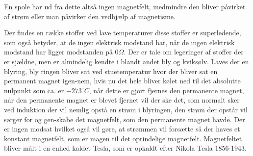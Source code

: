 En spole har ud fra dette altså ingen magnetfelt, medmindre den bliver påvirket af strøm eller man påvirker den vedhjælp af magnetisme. 

Der findes en række stoffer ved lave temperaturer disse stoffer er superledende, som også betyder, at de ingen elektrisk modstand har, når de ingen elektrisk modstand har ligger modstanden på $0 \Omega$. Der er tale om legeringer af stoffer der er sjældne, men er almindelig kendte i blandt andet bly og kviksølv. Laves der en blyring, bly ringen bliver sat ved stuetemperatur hvor der bliver sat en permanent magnet igen-nem, hvis nu det hele bliver kølet ned til det absolutte nulpunkt som ca. er $-273^\circ C$, når dette er gjort fjernes den permanente magnet, når den permanente magnet er blevet fjernet vil der ske det, som normalt sker ved induktion der vil nemlig opstå en strøm i blyringen, den strøm der opstår vil sørger for og gen-skabe det magnetfelt, som den permanente magnet havde. Der er ingen modsat hvilket også vil gøre, at strømmen vil forsætte så der haves et konstant magnetfelt, som er magen til det oprindelige magnetfelt. Magnetfeltet bliver målt i en enhed kaldet Tesla, som er opkaldt efter Nikola Tesla 1856-1943. \cite{spoler}

